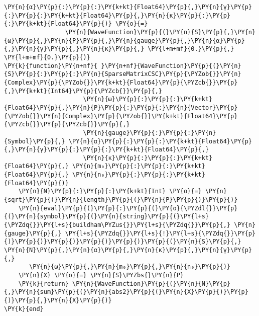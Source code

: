 \begin{Verbatim}[commandchars=\\\{\}]
             \PY{n}{α}\PY{p}{:}\PY{p}{:}\PY{k+kt}{Float64}\PY{p}{,}\PY{n}{γ}\PY{p}{:}\PY{p}{:}\PY{k+kt}{Float64}\PY{p}{,}\PY{n}{κ}\PY{p}{:}\PY{p}{:}\PY{k+kt}{Float64}\PY{p}{)} \PY{o}{=}
                 \PY{n}{WaveFunction}\PY{p}{(}\PY{n}{S}\PY{p}{,}\PY{n}{ω}\PY{p}{,}\PY{n}{P}\PY{p}{,}\PY{n}{gauge}\PY{p}{,}\PY{n}{α}\PY{p}{,}\PY{n}{γ}\PY{p}{,}\PY{n}{κ}\PY{p}{,} \PY{l+m+mf}{0.}\PY{p}{,} \PY{l+m+mf}{0.}\PY{p}{)}
\PY{k}{function}\PY{n+nf}{ }\PY{n+nf}{WaveFunction}\PY{p}{(}\PY{n}{S}\PY{p}{:}\PY{p}{:}\PY{n}{SparseMatrixCSC}\PY{p}{\PYZob{}}\PY{n}{Complex}\PY{p}{\PYZob{}}\PY{k+kt}{Float64}\PY{p}{\PYZcb{}}\PY{p}{,}\PY{k+kt}{Int64}\PY{p}{\PYZcb{}}\PY{p}{,}
                      \PY{n}{ω}\PY{p}{:}\PY{p}{:}\PY{k+kt}{Float64}\PY{p}{,}\PY{n}{P}\PY{p}{:}\PY{p}{:}\PY{n}{Vector}\PY{p}{\PYZob{}}\PY{n}{Complex}\PY{p}{\PYZob{}}\PY{k+kt}{Float64}\PY{p}{\PYZcb{}}\PY{p}{\PYZcb{}}\PY{p}{,}
                      \PY{n}{gauge}\PY{p}{:}\PY{p}{:}\PY{n}{Symbol}\PY{p}{,} \PY{n}{α}\PY{p}{:}\PY{p}{:}\PY{k+kt}{Float64}\PY{p}{,}\PY{n}{γ}\PY{p}{:}\PY{p}{:}\PY{k+kt}{Float64}\PY{p}{,}
                      \PY{n}{κ}\PY{p}{:}\PY{p}{:}\PY{k+kt}{Float64}\PY{p}{,} \PY{n}{m₀}\PY{p}{:}\PY{p}{:}\PY{k+kt}{Float64}\PY{p}{,} \PY{n}{n₀}\PY{p}{:}\PY{p}{:}\PY{k+kt}{Float64}\PY{p}{)}
    \PY{n}{N}\PY{p}{:}\PY{p}{:}\PY{k+kt}{Int} \PY{o}{=} \PY{n}{sqrt}\PY{p}{(}\PY{n}{length}\PY{p}{(}\PY{n}{P}\PY{p}{)}\PY{p}{)}
    \PY{n}{eval}\PY{p}{(}\PY{p}{:}\PY{p}{(}\PY{o}{\PYZdl{}}\PY{p}{(}\PY{n}{symbol}\PY{p}{(}\PY{n}{string}\PY{p}{(}\PY{l+s}{\PYZdq{}}\PY{l+s}{buildham\PYZus{}}\PY{l+s}{\PYZdq{}}\PY{p}{,} \PY{n}{gauge}\PY{p}{,} \PY{l+s}{\PYZdq{}}\PY{l+s}{!}\PY{l+s}{\PYZdq{}}\PY{p}{)}\PY{p}{)}\PY{p}{)}\PY{p}{)}\PY{p}{)}\PY{p}{(}\PY{n}{S}\PY{p}{,} \PY{n}{N}\PY{p}{,}\PY{n}{α}\PY{p}{,}\PY{n}{κ}\PY{p}{,}\PY{n}{γ}\PY{p}{,}
       \PY{n}{ω}\PY{p}{,}\PY{n}{m₀}\PY{p}{,}\PY{n}{n₀}\PY{p}{)}
    \PY{n}{X} \PY{o}{=} \PY{n}{S}\PYZbs{}\PY{n}{P}
    \PY{k}{return} \PY{n}{WaveFunction}\PY{p}{(}\PY{n}{N}\PY{p}{,}\PY{n}{sum}\PY{p}{(}\PY{n}{abs2}\PY{p}{(}\PY{n}{X}\PY{p}{)}\PY{p}{)}\PY{p}{,}\PY{n}{X}\PY{p}{)}
\PY{k}{end}


\end{Verbatim}
